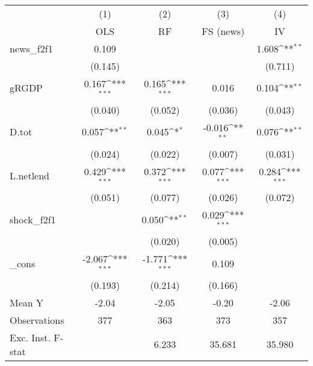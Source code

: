 {
\def\sym#1{\ifmmode^{#1}\else\(^{#1}\)\fi}
\begin{tabular}{l*{4}{c}}
\toprule
            &\multicolumn{1}{c}{(1)}&\multicolumn{1}{c}{(2)}&\multicolumn{1}{c}{(3)}&\multicolumn{1}{c}{(4)}\\
            &\multicolumn{1}{c}{OLS}&\multicolumn{1}{c}{RF}&\multicolumn{1}{c}{FS (news)}&\multicolumn{1}{c}{IV}\\
\midrule
news\_f2f1   &       0.109         &                     &                     &       1.608\sym{**} \\
            &     (0.145)         &                     &                     &     (0.711)         \\
\addlinespace
gRGDP       &       0.167\sym{***}&       0.165\sym{***}&       0.016         &       0.104\sym{**} \\
            &     (0.040)         &     (0.052)         &     (0.036)         &     (0.043)         \\
\addlinespace
D.tot       &       0.057\sym{**} &       0.045\sym{*}  &      -0.016\sym{**} &       0.076\sym{**} \\
            &     (0.024)         &     (0.022)         &     (0.007)         &     (0.031)         \\
\addlinespace
L.netlend   &       0.429\sym{***}&       0.372\sym{***}&       0.077\sym{***}&       0.284\sym{***}\\
            &     (0.051)         &     (0.077)         &     (0.026)         &     (0.072)         \\
\addlinespace
shock\_f2f1  &                     &       0.050\sym{**} &       0.029\sym{***}&                     \\
            &                     &     (0.020)         &     (0.005)         &                     \\
\addlinespace
\_cons      &      -2.067\sym{***}&      -1.771\sym{***}&       0.109         &                     \\
            &     (0.193)         &     (0.214)         &     (0.166)         &                     \\
\midrule
Mean Y      &       -2.04         &       -2.05         &       -0.20         &       -2.06         \\
Observations&         377         &         363         &         373         &         357         \\
Exc. Inst. F-stat&                     &       6.233         &      35.681         &      35.980         \\
\bottomrule
\end{tabular}
}
